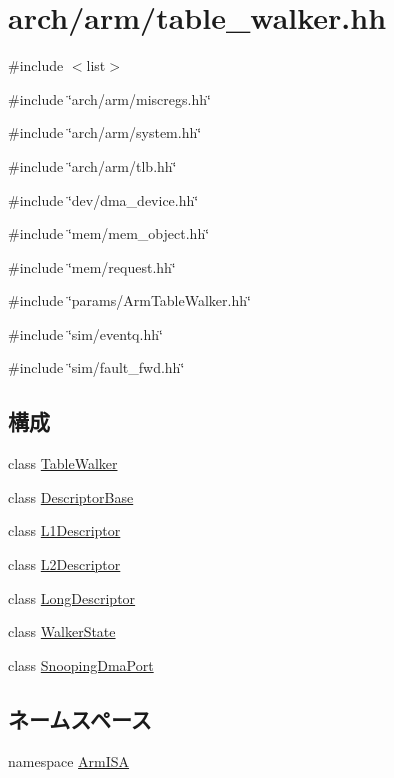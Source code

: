 \hypertarget{table__walker_8hh}{
\section{arch/arm/table\_\-walker.hh}
\label{table__walker_8hh}
}
{\ttfamily \#include $<$list$>$}\par
{\ttfamily \#include \char`\"{}arch/arm/miscregs.hh\char`\"{}}\par
{\ttfamily \#include \char`\"{}arch/arm/system.hh\char`\"{}}\par
{\ttfamily \#include \char`\"{}arch/arm/tlb.hh\char`\"{}}\par
{\ttfamily \#include \char`\"{}dev/dma\_\-device.hh\char`\"{}}\par
{\ttfamily \#include \char`\"{}mem/mem\_\-object.hh\char`\"{}}\par
{\ttfamily \#include \char`\"{}mem/request.hh\char`\"{}}\par
{\ttfamily \#include \char`\"{}params/ArmTableWalker.hh\char`\"{}}\par
{\ttfamily \#include \char`\"{}sim/eventq.hh\char`\"{}}\par
{\ttfamily \#include \char`\"{}sim/fault\_\-fwd.hh\char`\"{}}\par
\subsection*{構成}
\begin{DoxyCompactItemize}
\item 
class \hyperlink{classArmISA_1_1TableWalker}{TableWalker}
\item 
class \hyperlink{classArmISA_1_1TableWalker_1_1DescriptorBase}{DescriptorBase}
\item 
class \hyperlink{classArmISA_1_1TableWalker_1_1L1Descriptor}{L1Descriptor}
\item 
class \hyperlink{classArmISA_1_1TableWalker_1_1L2Descriptor}{L2Descriptor}
\item 
class \hyperlink{classArmISA_1_1TableWalker_1_1LongDescriptor}{LongDescriptor}
\item 
class \hyperlink{classArmISA_1_1TableWalker_1_1WalkerState}{WalkerState}
\item 
class \hyperlink{classArmISA_1_1TableWalker_1_1SnoopingDmaPort}{SnoopingDmaPort}
\end{DoxyCompactItemize}
\subsection*{ネームスペース}
\begin{DoxyCompactItemize}
\item 
namespace \hyperlink{namespaceArmISA}{ArmISA}
\end{DoxyCompactItemize}

